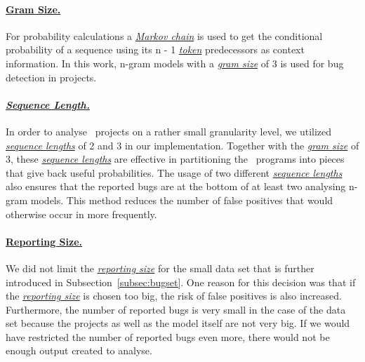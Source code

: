 \paragraph{\hyperref[def:gram_size]{Gram Size.}}
For probability calculations a \hyperref[def:markov_chain]{\textit{Markov chain}} is used to get the conditional probability of a sequence using its n - 1 \hyperref[def:token]{\textit{token}} predecessors as context information. In this work, n-gram models with a \hyperref[def:gram_size]{\textit{gram size}} of 3 is used for bug detection in \scratch{} projects. 

\paragraph{\hyperref[def:sequence_length]{\textit{Sequence Length.}}}
In order to analyse \scratch\ projects on a rather small granularity level, we utilized \hyperref[def:sequence_length]{\textit{sequence lengths}} of 2 and 3 in our implementation. Together with the \hyperref[def:gram_size]{\textit{gram size}} of 3, these \hyperref[def:sequence_length]{\textit{sequence lengths}} are effective in partitioning the \scratch\ programs into pieces that give back useful probabilities. The usage of two different \hyperref[def:sequence_length]{\textit{sequence lengths}} also ensures that the reported bugs are at the bottom of at least two analysing n-gram models. This method reduces the number of false positives that would otherwise occur in more frequently.

\paragraph{\hyperref[def:reporting_size]{Reporting Size.}}
We did not limit the \hyperref[def:reporting_size]{\textit{reporting size}} for the small data set that is further introduced in Subsection~\ref{subsec:bugset}. One reason for this decision was that if the \hyperref[def:reporting_size]{\textit{reporting size}} is chosen too big, the risk of false positives is also increased. Furthermore, the number of reported bugs is very small in the case of the data set because the projects as well as the model itself are not very big. If we would have restricted the number of reported bugs even more, there would not be enough output created to analyse.  

